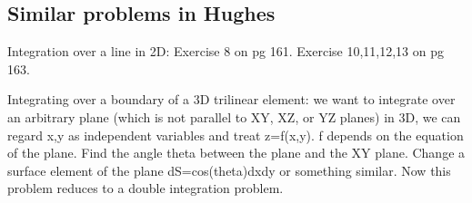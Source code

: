 \documentclass{article}
\begin{document}
\subsection{Similar problems in Hughes}
Integration over a line in 2D: Exercise 8 on pg 161. Exercise 10,11,12,13 on pg 163.

Integrating over a boundary of a 3D trilinear element: we want to integrate over an arbitrary plane (which is not parallel to XY, XZ, or YZ planes) in 3D, we can regard x,y as independent variables and treat z=f(x,y). f depends on the equation of the plane.  Find the angle theta between the plane and the XY plane. Change a surface element of the plane dS=cos(theta)dxdy or something similar. Now this problem reduces to a double integration problem. 
\end{document}
